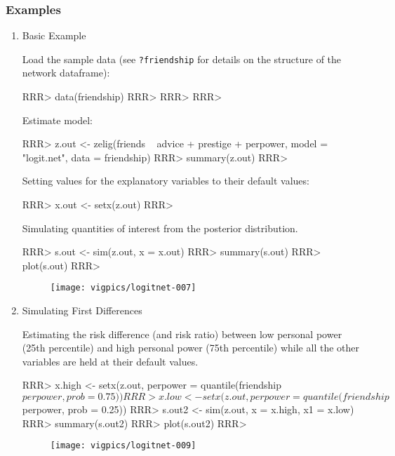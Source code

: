 \subsubsection{Examples}
\begin{enumerate}
\item Basic Example

Load the sample data (see {\tt ?friendship} for details on the structure of the network dataframe):

\begin{Schunk}
\begin{Sinput}
RRR> data(friendship)
RRR> 
RRR> 
RRR> 
\end{Sinput}
\end{Schunk}
Estimate model:

\begin{Schunk}
\begin{Sinput}
RRR> z.out <- zelig(friends ~ advice + prestige + perpower, model = "logit.net", data = friendship)
RRR> summary(z.out)
RRR> 
\end{Sinput}
\end{Schunk}
Setting values for the explanatory variables to their default values:

\begin{Schunk}
\begin{Sinput}
RRR> x.out <- setx(z.out)
RRR> 
\end{Sinput}
\end{Schunk}
Simulating quantities of interest from the posterior distribution.
\begin{Schunk}
\begin{Sinput}
RRR> s.out <- sim(z.out, x = x.out) 
RRR> summary(s.out) 
RRR> plot(s.out) 
RRR> 
\end{Sinput}
\end{Schunk}

\begin{figure}[here]
\centering
\texttt{[image: vigpics/logitnet-007]}
\label{fig:plotgam}
\end{figure}


\item Simulating First Differences

Estimating the risk difference (and risk ratio) between low personal power (25th percentile) and high personal power (75th percentile) while all the other variables are held at their default values. 

\begin{Schunk}
\begin{Sinput}
RRR> x.high <- setx(z.out, perpower = quantile(friendship$perpower, prob = 0.75))    
RRR> x.low  <- setx(z.out, perpower = quantile(friendship$perpower, prob = 0.25))
RRR> s.out2 <- sim(z.out, x = x.high, x1 = x.low)   
RRR> summary(s.out2)   
RRR> plot(s.out2)   
RRR> 
\end{Sinput}
\end{Schunk}

\begin{figure}[here]
\centering
\texttt{[image: vigpics/logitnet-009]}
\label{fig:plotgam}
\end{figure}



\end{enumerate}
